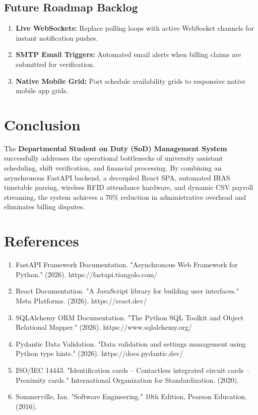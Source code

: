 \documentclass[10pt,a4paper,twocolumn,fleqn]{article}
\newcommand{\myurl}[1]{{\small #1}}
\begin{document}
\subsection{Future Roadmap Backlog}
\begin{enumerate}
    \item \textbf{Live WebSockets:} Replace polling loops with active WebSocket channels for instant notification pushes.
    \item \textbf{SMTP Email Triggers:} Automated email alerts when billing claims are submitted for verification.
    \item \textbf{Native Mobile Grid:} Port schedule availability grids to responsive native mobile app grids.
\end{enumerate}

\section{Conclusion}
The \textbf{Departmental Student on Duty (SoD) Management System} successfully addresses the operational bottlenecks of university assistant scheduling, shift verification, and financial processing. By combining an asynchronous FastAPI backend, a decoupled React SPA, automated IRAS timetable parsing, wireless RFID attendance hardware, and dynamic CSV payroll streaming, the system achieves a 70\% reduction in administrative overhead and eliminates billing disputes.

\section*{References}
\begin{enumerate}
\item FastAPI Framework Documentation. "Asynchronous Web Framework for Python." (2026). \myurl{https://fastapi.tiangolo.com/}
\item React Documentation. "A JavaScript library for building user interfaces." Meta Platforms. (2026). \myurl{https://react.dev/}
\item SQLAlchemy ORM Documentation. "The Python SQL Toolkit and Object Relational Mapper." (2026). \myurl{https://www.sqlalchemy.org/}
\item Pydantic Data Validation. "Data validation and settings management using Python type hints." (2026). \myurl{https://docs.pydantic.dev/}
\item ISO/IEC 14443. "Identification cards -- Contactless integrated circuit cards -- Proximity cards." International Organization for Standardization. (2020).
\item Sommerville, Ian. "Software Engineering." 10th Edition, Pearson Education. (2016).
\end{enumerate}
\end{document}
